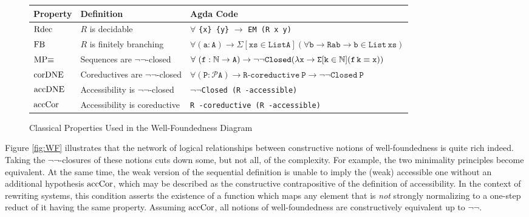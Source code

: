 
{
\def\arraystretch{1.3}
\begin{figure}[h!]
\small
\begin{tabular}{@{}l l l @{}}
\toprule
\textbf{Property} & \textbf{Definition}  &\textbf{Agda Code}  \\
\midrule
$\mathrm{Rdec}$   & $R$ is decidable
          & $\forall$ \verb|{x} {y}| $\to$ \verb|EM (R x y)|\\
$\mathrm{FB}$     & $R$ is finitely branching
          & $\mathtt{\forall (a : A) \to \Sigma [ xs \in List A ] (\forall b \to R a b \to b \in{}List\, xs)}$ \\
$\mathrm{MP}{\equiv}$    & Sequences are $\lnot\lnot$-closed
          & $\forall\ \mathtt{(f : \nat \to A) \to \lnot\lnot Closed
          (\lambda x \to \Sigma [ k \in \nat ] (f\, k \equiv x))}$ \\
$\mathrm{corDNE}$ & Coreductives are $\lnot\lnot$-closed
          & $\mathtt{\forall (P : \mathcal{P} A) \to R}$-$\mathtt{coreductive\ P \to \lnot\lnot Closed\ P}$\\
$\mathrm{accDNE}$ & Accessibility is $\lnot\lnot$-closed
          & $\lnot\lnot$\verb|Closed (R -accessible)| \\
$\mathrm{accCor}$ & Accessibility is coreductive
          & \verb|R -coreductive (R -accessible)| \\
\bottomrule
\end{tabular}
\centering
\caption{Classical Properties Used in the Well-Foundedness Diagram}
\label{tab:cprop}
\end{figure}
}
\clearpage
Figure \ref{fig:WF} illustrates that the network of logical relationships between
constructive notions of well-foundedness is quite rich indeed.
Taking the $\lnot\lnot$-closures of
these notions cuts down some, but not all, of the complexity.
For example, the two minimality principles become equivalent.
At the same time, the weak version of the sequential definition is unable to imply
the (weak) accessible one without an additional hypothesis $\mathrm{accCor}$,
which may be described as the constructive contrapositive of the definition of accessibility.
In the context of rewriting systems,
this condition asserts the existence of a function which maps any
element that is \emph{not} strongly normalizing to a one-step reduct of it having the same property.
Assuming $\mathrm{accCor}$, all notions of well-foundedness
are constructively equivalent up to $\lnot\lnot$.

